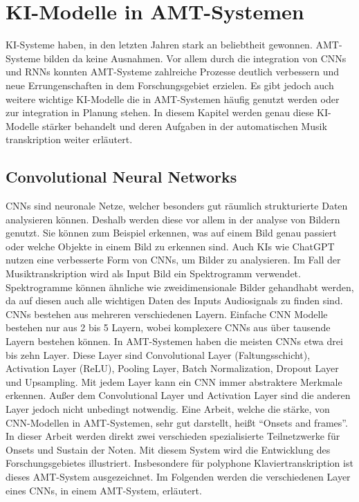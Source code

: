 \section{KI-Modelle in AMT-Systemen}
\label{sec:ki_integration}
KI-Systeme haben, in den letzten Jahren stark an beliebtheit gewonnen.
AMT-Systeme bilden da keine Ausnahmen.
Vor allem durch die integration von CNNs und RNNs konnten AMT-Systeme zahlreiche Prozesse deutlich verbessern
und neue Errungenschaften in dem Forschungsgebiet erzielen.
Es gibt jedoch auch weitere wichtige KI-Modelle die in AMT-Systemen häufig genutzt werden
oder zur integration in Planung stehen.
In diesem Kapitel werden genau diese KI-Modelle stärker behandelt
und deren Aufgaben in der automatischen Musik transkription weiter erläutert.

\subsection{Convolutional Neural Networks}
CNNs sind neuronale Netze, welcher besonders gut räumlich strukturierte Daten analysieren können.
Deshalb werden diese vor allem in der analyse von Bildern genutzt.
Sie können zum Beispiel erkennen, was auf einem Bild genau passiert oder welche Objekte in einem Bild zu erkennen sind.
Auch KIs wie ChatGPT nutzen eine verbesserte Form von CNNs, um Bilder zu analysieren.
Im Fall der Musiktranskription wird als Input Bild ein Spektrogramm verwendet.
Spektrogramme können ähnliche wie zweidimensionale Bilder gehandhabt werden,
da auf diesen auch alle wichtigen Daten des Inputs Audiosignals zu finden sind.
CNNs bestehen aus mehreren verschiedenen Layern.
Einfache CNN Modelle bestehen nur aus 2 bis 5 Layern,
wobei komplexere CNNs aus über tausende Layern bestehen können.
In AMT-Systemen haben die meisten CNNs etwa drei bis zehn Layer.
Diese Layer sind Convolutional Layer (Faltungsschicht), Activation Layer (ReLU), Pooling Layer,
Batch Normalization, Dropout Layer und Upsampling.
Mit jedem Layer kann ein CNN immer abstraktere Merkmale erkennen.
Außer dem Convolutional Layer und Activation Layer sind die anderen Layer jedoch nicht unbedingt notwendig.
Eine Arbeit, welche die stärke, von CNN-Modellen in AMT-Systemen, sehr gut darstellt, heißt \enquote{Onsets and frames}\cite{hawthorne2017onsets}.
In dieser Arbeit werden direkt zwei verschieden spezialisierte Teilnetzwerke für Onsets und Sustain der Noten.
Mit diesem System wird die Entwicklung des Forschungsgebietes illustriert.
Insbesondere für polyphone Klaviertranskription ist dieses AMT-System ausgezeichnet.
Im Folgenden werden die verschiedenen Layer eines CNNs, in einem AMT-System, erläutert.

